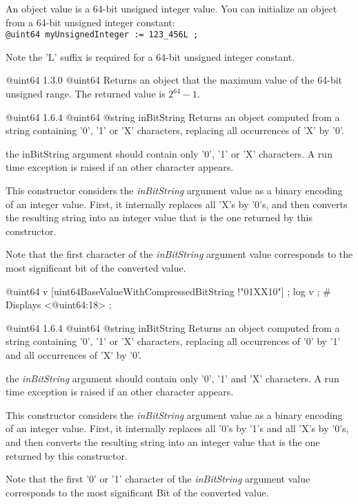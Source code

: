 
An  object value is a 64-bit unsigned integer value. You can initialize an  object from a 64-bit unsigned integer constant:\\

\texttt{@uint64 myUnsignedInteger := 123\_456L ;}\newline

Note the 'L' suffix is required for a 64-bit unsigned integer constant.



{@uint64}
{1.3.0}
{@uint64}
{Returns an  object that the maximum value of the 64-bit unsigned range.}
{The returned value is $2^{64}-1$.}


{@uint64}
{1.6.4}
{@uint64}
{@string inBitString}
{Returns an  object computed from a string containing '0', '1' or 'X' characters, replacing all occurrences of 'X' by '0'.}
{the inBitString argument should contain only '0', '1' or 'X' characters. A run time exception is raised if an other character appears.

This constructor considers the \emph{inBitString} argument value as a binary encoding of an integer value. First, it internally replaces all 'X's by '0's, and then converts the resulting string into an integer value that is the one returned by this constructor.

Note that the first character of the \emph{inBitString} argument value corresponds to the most significant bit of the converted value.}


\exempleDeuxLignes
{}
{@uint64 v [uint64BaseValueWithCompressedBitString !"01XX10"] ;}
{log v ; \# Displays <@uint64:18> ;}





{@uint64}
{1.6.4}
{@uint64}
{@string inBitString}
{Returns an  object computed from a string containing '0', '1' or 'X' characters, replacing all occurrences of '0' by '1' and all occurrences of 'X' by '0'.}
{the \emph{inBitString} argument should contain only '0', '1' and 'X' characters. A run time exception is raised if an other character appears.

This constructor considers the \emph{inBitString} argument value as a binary encoding of an integer value. First, it internally replaces all '0's by '1's and all 'X's by '0's, and then converts the resulting string into an integer value that is the one returned by this constructor.

Note that the first '0' or '1' character of the \emph{inBitString} argument value corresponds to the most significant Bit of the converted value.}

